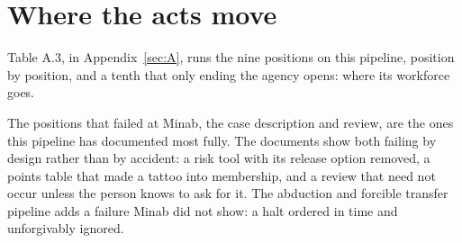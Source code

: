\section{Where the acts move}
\label{sec:11.3}
Table A.3, in Appendix~\ref{sec:A}, runs the nine positions on this pipeline, position by position, and a tenth that only ending the agency opens: where its workforce goes.

The positions that failed at Minab, the case description and review, are the ones this pipeline has documented most fully. The documents show both failing by design rather than by accident: a risk tool with its release option removed, a points table that made a tattoo into membership, and a review that need not occur unless the person knows to ask for it. The abduction and forcible transfer pipeline adds a failure Minab did not show: a halt ordered in time and unforgivably ignored.
